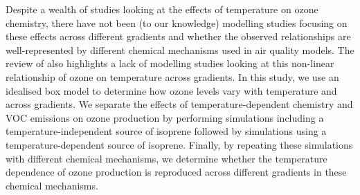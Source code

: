 Despite a wealth of studies looking at the effects of temperature on ozone chemistry, there have not been (to our knowledge) modelling studies focusing on these effects across different  gradients and whether the observed relationships are well-represented by different chemical mechanisms used in air quality models.
The review of \citet{Pusede:2015} also highlights a lack of modelling studies looking at this non-linear relationship of ozone on temperature across  gradients.
In this study, we use an idealised box model to determine how ozone levels vary with temperature and across  gradients.
We separate the effects of temperature-dependent chemistry and VOC emissions on ozone production by performing simulations including a temperature-independent source of isoprene followed by simulations using a temperature-dependent source of isoprene. 
Finally, by repeating these simulations with different chemical mechanisms, we determine whether the temperature dependence of ozone production is reproduced across different  gradients in these chemical mechanisms.
